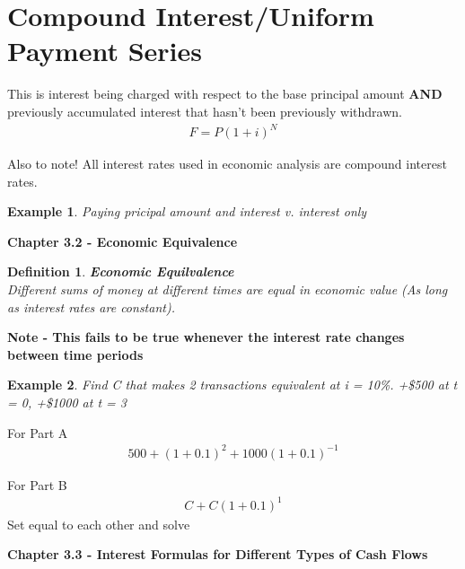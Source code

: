 \documentclass{report} %
\newtheorem{exmp}{Example}
\newtheorem{defn}{Definition}
\begin{document}
\section*{Compound Interest/Uniform Payment Series}
This is interest being charged with respect to the base principal amount \textbf{AND} previously accumulated interest that hasn't been previously withdrawn.
    \begin{equation*}
        \begin{aligned}
            F = P(1+i)^N
        \end{aligned}
    \end{equation*}

Also to note! All interest rates used in economic analysis are compound interest rates.

\begin{exmp}
    Paying pricipal amount and interest v. interest only
\end{exmp}

\newpage
\begin{center}
    \LARGE{\textbf{Chapter 3.2 - Economic Equivalence}}
\end{center}


\begin{defn}
    \textbf{Economic Equilvalence} \\
    Different sums of money at different times are equal in economic value (As long as interest rates are constant).
\end{defn}

\textbf{Note - This fails to be true whenever the interest rate changes between time periods}

\begin{exmp}
    Find C that makes 2 transactions equivalent at i = 10\%. +\$500 at t = 0, +\$1000 at t = 3
\end{exmp}
For Part A
\begin{equation*}
    \begin{aligned}
        500 + (1+0.1)^2+1000(1+0.1)^{-1}
    \end{aligned}
\end{equation*}

For Part B
\begin{equation*}
    \begin{aligned}
        C + C(1+0.1)^1
    \end{aligned}
\end{equation*}
Set equal to each other and solve

\begin{center} 
    \LARGE{\textbf{Chapter 3.3 - Interest Formulas for Different Types of Cash Flows}}
\end{center}
\end{document}
